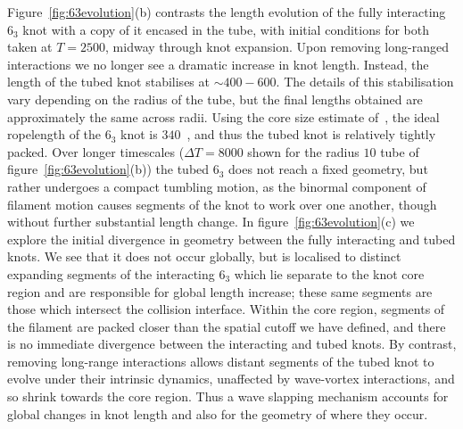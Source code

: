 Figure~\ref{fig:63evolution}(b) contrasts the length evolution of the fully interacting $6_3$ knot with a copy of it encased in the tube, with initial conditions for both taken at $T=2500$, midway through knot expansion. Upon removing long-ranged interactions we no longer see a dramatic increase in knot length. Instead, the length of the tubed knot stabilises at $\sim 400- 600$. The details of this stabilisation vary depending on the radius of the tube, but the final lengths obtained are approximately the same across radii. Using the core size estimate of~\citep{Maucher2017}, the ideal ropelength of the $6_3$ knot is $340$~\citep{Cantarella2011}, and thus the tubed knot is relatively tightly packed. Over longer timescales ($\Delta T=8000$ shown for the radius $10$ tube of figure~\ref{fig:63evolution}(b)) the tubed $6_3$ does not reach a fixed geometry, but rather undergoes a compact tumbling motion, as the binormal component of filament motion causes segments of the knot to work over one another, though without further substantial length change. In figure~\ref{fig:63evolution}(c) we explore the initial divergence in geometry between the fully interacting and tubed knots. We see that it does not occur globally, but is localised to distinct expanding segments of the interacting $6_3$ which lie separate to the knot core region and are responsible for global length increase; these same segments are those which intersect the collision interface. Within the core region, segments of the filament are packed closer than the spatial cutoff we have defined, and there is no immediate divergence between the interacting and tubed knots. By contrast, removing long-range interactions allows distant segments of the tubed knot to evolve under their intrinsic dynamics, unaffected by wave-vortex interactions, and so shrink towards the core region. Thus a wave slapping mechanism accounts for global changes in knot length and also for the geometry of where they occur. 

